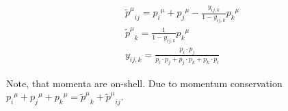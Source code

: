 \begin{equation}
\begin{split}
&{\tilde{p}^{\mu}}_{ij} = {p_i}^{\mu}+{p_j}^{\mu}-\frac{y_{ij,k}}{1-y_{ij,k}}{p_k}^{\mu}\\
&{\tilde{p}^{\mu}}_{k} = \frac{1}{1-y_{ij,k}}{p_k}^{\mu}\\
&y_{ij,k}=\frac{p_i \cdot p_j}{p_i \cdot p_j+p_j \cdot p_k+p_k \cdot p_i}
\end{split}
\end{equation}

Note, that momenta are on-shell. Due to momentum conservation ${p_i}^{\mu}+{p_j}^{\mu}+{p_k}^{\mu}= {\tilde{p}^{\mu}}_{k} +{\tilde{p}^{\mu}}_{ij} $. 
